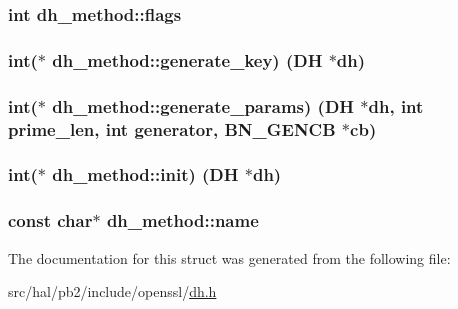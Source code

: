 \subsubsection[{\texorpdfstring{flags}{flags}}]{\setlength{\rightskip}{0pt plus 5cm}int dh\+\_\+method\+::flags}\hypertarget{structdh__method_ab1ae3816d0648ee6d7345087df0fa61c}{}\label{structdh__method_ab1ae3816d0648ee6d7345087df0fa61c}
\subsubsection[{\texorpdfstring{generate\+\_\+key}{generate_key}}]{\setlength{\rightskip}{0pt plus 5cm}int($\ast$ dh\+\_\+method\+::generate\+\_\+key) ({\bf DH} $\ast$dh)}\hypertarget{structdh__method_aa044fbb69099292fac13ab075afbe8cd}{}\label{structdh__method_aa044fbb69099292fac13ab075afbe8cd}
\subsubsection[{\texorpdfstring{generate\+\_\+params}{generate_params}}]{\setlength{\rightskip}{0pt plus 5cm}int($\ast$ dh\+\_\+method\+::generate\+\_\+params) ({\bf DH} $\ast$dh, int prime\+\_\+len, int generator, {\bf B\+N\+\_\+\+G\+E\+N\+CB} $\ast${\bf cb})}\hypertarget{structdh__method_ae2c9fce365f3381757c58f0e00441453}{}\label{structdh__method_ae2c9fce365f3381757c58f0e00441453}
\subsubsection[{\texorpdfstring{init}{init}}]{\setlength{\rightskip}{0pt plus 5cm}int($\ast$ dh\+\_\+method\+::init) ({\bf DH} $\ast$dh)}\hypertarget{structdh__method_a672b716394908a7d67984290a41015c9}{}\label{structdh__method_a672b716394908a7d67984290a41015c9}
\subsubsection[{\texorpdfstring{name}{name}}]{\setlength{\rightskip}{0pt plus 5cm}const char$\ast$ dh\+\_\+method\+::name}\hypertarget{structdh__method_a87f4af9c60229836248385adca5caa21}{}\label{structdh__method_a87f4af9c60229836248385adca5caa21}


The documentation for this struct was generated from the following file\+:\begin{DoxyCompactItemize}
\item 
src/hal/pb2/include/openssl/\hyperlink{dh_8h}{dh.\+h}\end{DoxyCompactItemize}
